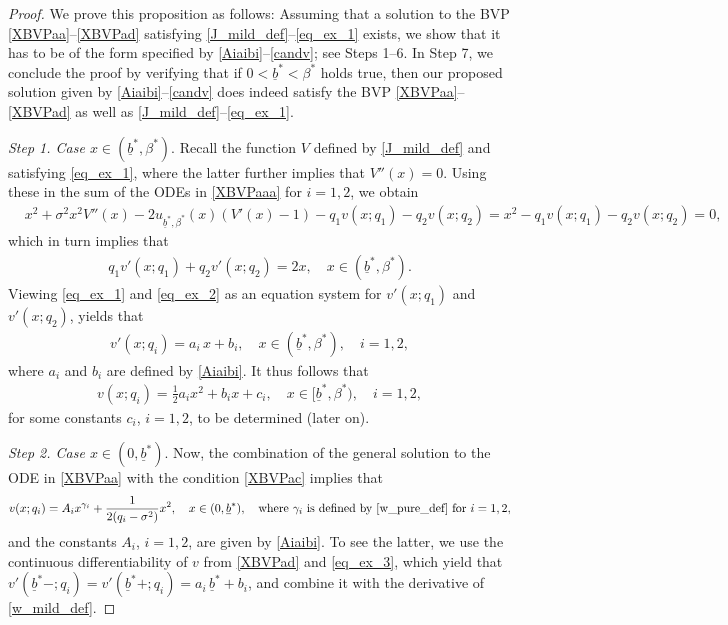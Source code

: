 \documentclass[11pt]{article} %
\def\ub{\underline{b}}
\numberwithin{komcounter}{section}
\begin{document}
\begin{proof} 
We prove this proposition as follows:
Assuming that a solution to the BVP \eqref{XBVPaa}--\eqref{XBVPad} satisfying \eqref{J_mild_def}--\eqref{eq_ex_1} exists, we show that it has to be of the form specified by \eqref{Aiaibi}--\eqref{candv}; see Steps 1--6. 
In Step 7, we conclude the proof by verifying that if  $0 < \ub^* < \beta^*$ holds true, then our proposed solution given by \eqref{Aiaibi}--\eqref{candv} does indeed satisfy the BVP \eqref{XBVPaa}--\eqref{XBVPad} as well as \eqref{J_mild_def}--\eqref{eq_ex_1}. 



\vspace{1mm}
{\it Step 1. Case $x \in (\ub^*,\beta^*)$}.
Recall the function $V$ defined by \eqref{J_mild_def} and satisfying \eqref{eq_ex_1}, where the latter further implies that $V''(x)=0$. 
Using these in the sum of the ODEs in \eqref{XBVPaaa} for $i=1,2$, we obtain
\begin{align} \label{eq_ex_2b}
&x^2 + \sigma^2 x^2 V''(x) - 2 u_{\ub^*,\beta^*}(x) (V'(x) - 1) - q_1 v(x;q_1) - q_2 v(x;q_2) %
= x^2 - q_1 v(x;q_1) - q_2 v(x;q_2) = 0, 
\end{align}
which in turn implies that 
\begin{align} \label{eq_ex_2}
q_1 v'(x;q_1) + q_2 v'(x;q_2) = 2x , \quad x \in (\ub^*, \beta^*). 
\end{align}
Viewing \eqref{eq_ex_1} and \eqref{eq_ex_2} as an equation system for $v'(x;q_1)$ and $v'(x;q_2)$, yields that 
\begin{align} \label{eq_ex_3}
v'(x;q_i) = a_i \, x + b_i, \quad x \in (\ub^*, \beta^*), \quad i=1,2, 
\end{align}
where $a_i$ and $b_i$ are defined by \eqref{Aiaibi}. 
It thus follows that 
\begin{align}\label{hq2hkl12r}
v(x;q_i) = \tfrac{1}{2} a_i x^2 + b_i x + c_i, 
\quad x \in [\ub^*,\beta^*), \quad i=1,2, 
\end{align}
for some constants $c_i$, $i=1,2$, to be determined (later on). 

\vspace{1mm}
{\it Step 2. Case $x \in (0,\ub^*)$}.
Now, the combination of the general solution to the ODE in \eqref{XBVPaa} with the condition \eqref{XBVPac} implies that 
\begin{align}\label{w_mild_def}
v(x;q_i)=A_i x^{\gamma_i}+\frac{1}{2(q_i-\sigma^2)} x^2, \quad x\in (0,\ub^*), 
\quad \text{where } \gamma_i \text{ is defined by \eqref{w_pure_def} for $i=1,2$},
\end{align}
and the constants $A_i$, $i=1,2$, are given by \eqref{Aiaibi}. 
To see the latter, we use the continuous differentiability of $v$ from \eqref{XBVPad} and \eqref{eq_ex_3}, which yield that $v'(\ub^*-;q_i) = v'(\ub^*+;q_i) = a_i \, \ub^* + b_i$, and combine it with the derivative of \eqref{w_mild_def}. 


\end{proof}
\end{document}
